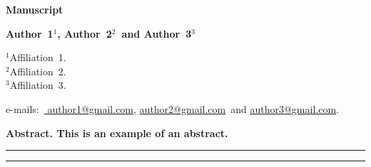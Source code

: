 \documentclass[main.tex]{subfiles}
\begin{document}
\thispagestyle{empty}
{
  \noindent
  \Large
  \bfseries
  Manuscript
  \bigskip
  \bigskip
}

{
  \noindent
  \bfseries
  Author~1${}^{1}${\normalfont,}
  Author~2${}^{2}${\normalfont~and}
  Author~3${}^{3}$
  \bigskip
}

{
  \noindent
  \footnotesize
  ${}^{1}$Affiliation~1. \\
  ${}^{2}$Affiliation~2. \\
  ${}^{3}$Affiliation~3.
  \bigskip
}

{
  \noindent
  \footnotesize
  \rmfamily
  e-mails:~\href{
    mailto:author1@gmail.com}{
    author1@gmail.com}{\normalfont,}
  \href{
    mailto:author2@gmail.com}{
    author2@gmail.com}{\normalfont~and}
  \href{
    mailto:author3@gmail.com
  }{
    author3@gmail.com}{\normalfont.}
  \bigskip
}

{
  \noindent
  \bfseries
  Abstract.
  \normalfont
  This is an example of an abstract.
  \bigskip
}

{
  \noindent
  \rule{\textwidth}{1pt}
  \tableofcontents
  \smallskip
  \noindent
  \rule{\linewidth}{1pt}
}
\end{document}
